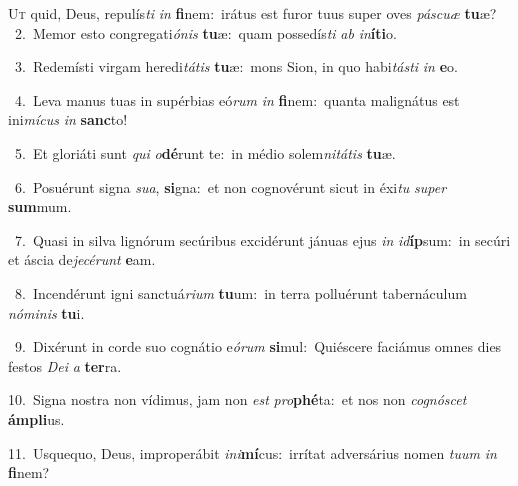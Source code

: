\lettrine{\initial\textcolor{\initialcolor}{U}}{t} quid, Deus, repulís\textit{ti} \textit{in} \textbf{fi}\-nem:~\star irátus est furor tuus super oves \textit{pás}\-\textit{cu}\textit{æ} \textbf{tu}\-æ?\\
{\numbfont\textcolor{\numbcolor}{~2.}}~Memor esto congregati\-\textit{ó}\-\textit{nis} \textbf{tu}\-æ:~\star quam possedís\textit{ti} \textit{ab} \textit{in}\-\textbf{í}\textbf{ti}o.\par
{\numbfont\textcolor{\numbcolor}{~3.}}~Redemísti virgam heredi\-\textit{tá}\-\textit{tis} \textbf{tu}\-æ:~\star mons Sion, in quo habi\-\textit{tás}\-\textit{ti} \textit{in} \textbf{e}\-o.\par
{\numbfont\textcolor{\numbcolor}{~4.}}~Leva manus tuas in supérbias eó\textit{rum} \textit{in} \textbf{fi}\-nem:~\star quanta malignátus est ini\-\textit{mí}\-\textit{cus} \textit{in} \textbf{sanc}\-to!\par
{\numbfont\textcolor{\numbcolor}{~5.}}~Et gloriáti sunt \textit{qui} \textit{o}\-\textbf{dé}runt te:~\star in médio solem\-\textit{ni}\-\textit{tá}\textit{tis} \textbf{tu}\-æ.\par
{\numbfont\textcolor{\numbcolor}{~6.}}~Posuérunt signa \textit{su}\-\textit{a}, \textbf{si}\-gna:~\star et non cognovérunt sicut in éxi\textit{tu} \textit{su}\-\textit{per} \textbf{sum}\-mum.\par
{\numbfont\textcolor{\numbcolor}{~7.}}~Quasi in silva lignórum secúribus excidérunt jánuas ejus \textit{in} \textit{id}\-\textbf{íp}sum:~\star in secúri et áscia de\-\textit{je}\-\textit{cé}\textit{runt} \textbf{e}\-am.\par
{\numbfont\textcolor{\numbcolor}{~8.}}~Incendérunt igni sanctuá\-\textit{ri}\-\textit{um} \textbf{tu}\-um:~\star in terra polluérunt tabernáculum \textit{nó}\-\textit{mi}\textit{nis} \textbf{tu}\-i.\par
{\numbfont\textcolor{\numbcolor}{~9.}}~Dixérunt in corde suo cognátio e\-\textit{ó}\-\textit{rum} \textbf{si}\-mul:~\star Quiéscere faciámus omnes dies festos \textit{De}\-\textit{i} \textit{a} \textbf{ter}\-ra.\par
{\numbfont\textcolor{\numbcolor}{10.}}~Signa nostra non vídimus, jam non \textit{est} \textit{pro}\-\textbf{phé}ta:~\star et nos non \textit{co}\-\textit{gnó}\textit{scet} \textbf{ám}\-\textbf{pli}us.\par
{\numbfont\textcolor{\numbcolor}{11.}}~Usquequo, Deus, improperábit \textit{in}\-\textit{i}\textbf{mí}cus:~\star irrítat adversárius nomen \textit{tu}\-\textit{um} \textit{in} \textbf{fi}\-nem?\par
